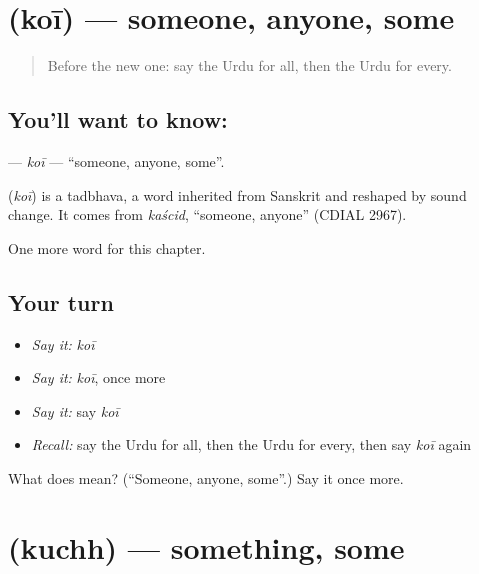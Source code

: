 \section[\texorpdfstring{\ur{کوئی} (koī)}{کوئی (koī)}]{ (koī) — someone, anyone, some}

\label{lesson:UR-C89-koi}



\begin{quote}
Before the new one: say the Urdu for all, then the Urdu for every.
\end{quote}

\subsection*{You'll want to know: }
\textbf{} — \emph{koī} — \textquotedblleft{}someone, anyone, some\textquotedblright{}.

\begin{cousinweb}
\textbf{} (\emph{koī}) is a tadbhava, a word inherited from Sanskrit and reshaped by sound change. It comes from \emph{kaścid}, \textquotedblleft{}someone, anyone\textquotedblright{} (CDIAL 2967).
\end{cousinweb}

\begin{grammarlens}[title={What you've built}]
One more word for this chapter.
\end{grammarlens}

\subsection*{Your turn}
\begin{itemize}
\raggedright
  \item \emph{Say it:} \emph{koī}
  \item \emph{Say it:} \emph{koī}, once more
  \item \emph{Say it:} say \emph{koī}
  \item \emph{Recall:} say the Urdu for all, then the Urdu for every, then say \emph{koī} again
\end{itemize}

\begin{tcolorbox}[breakable,colback=teal!4,colframe=teal!35!black,title={Before you move on}]
What does  mean? (\textquotedblleft{}Someone, anyone, some\textquotedblright{}.) Say it once more.
\end{tcolorbox}
\section[\texorpdfstring{\ur{کچھ} (kuchh)}{کچھ (kuchh)}]{ (kuchh) — something, some}

